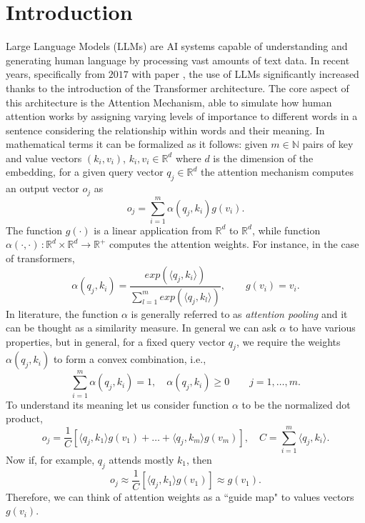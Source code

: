 \documentclass[11pt]{article}
\theoremstyle{plain}
\theoremstyle{remark}
\theoremstyle{definition}
\theoremstyle{plain}
\theoremstyle{plain}
\begin{document}
\section{Introduction}
Large Language Models (LLMs) are AI systems capable of understanding and generating human language by processing vast amounts of text data. In recent years, specifically from $2017$ with paper \cite{Mainarticle}, the use of LLMs significantly increased thanks to the introduction of the Transformer architecture. The core aspect of this architecture is the Attention Mechanism, able to simulate how human attention works by assigning varying levels of importance to different words in a sentence considering the relationship within words and their meaning.  \vskip2mm 
\noindent
In mathematical terms it can be formalized as it follows:
given $m \in \mathbb{N}$ pairs of key and value vectors $(k_i,v_i)$, $k_i,v_i \in \mathbb{R}^{d}$ where $d$ is the dimension of the embedding, for a given query vector $q_j \in \mathbb{R}^{d}$ the attention mechanism computes an output vector $o_j$ as
\[
o_j=\sum_{i=1}^{m} \alpha(q_j,k_i)g(v_i).
\]
The function $g(\cdot)$ is a linear application from $\mathbb{R}^{d}$ to $\mathbb{R}^{d}$, while function $\alpha(\cdot,\cdot)\,\colon \mathbb{R}^{d}\times \mathbb{R}^{d} \to \mathbb{R}^{+}$ computes the attention weights. For instance,
in the case of transformers,
\[
\alpha(q_j,k_i)=\frac{exp(\langle q_j,k_i\rangle)}{\sum_{l=1}^{m} exp(\langle q_j,k_l\rangle)}, \qquad g(v_i)=v_i.
\]
In literature, the function $\alpha$ is generally referred to as \textit{attention pooling} and it can be thought as a similarity measure. In general we can ask $\alpha$  to have various properties, but in general, for a fixed query vector $q_j$, we require the weights $\alpha(q_j,k_i)$ to form a convex combination, i.e., 
\[
\sum_{i=1}^{m} \alpha(q_j,k_i)=1, \quad \alpha(q_j,k_i)\geq 0 \qquad j=1,\ldots,m.
\]
To understand its meaning let us consider function $\alpha$ to be the normalized dot product,
\[
o_j= \frac{1}{C} [ \langle q_j,k_1\rangle g(v_1)+\ldots+\langle q_j,k_m\rangle g(v_m)], \quad C=\sum_{i=1}^{m} \langle q_j,k_i\rangle.
\]
Now if, for example, $q_j$ attends mostly $k_1$, then
\[
o_j \approx \frac{1}{C}[\langle q_j,k_1 \rangle g(v_1)] \approx g(v_1).
\]
Therefore, we can think of attention weights as a ``guide map" to values vectors $g(v_i)$. 
\vskip2mm 
\noindent
\end{document}
